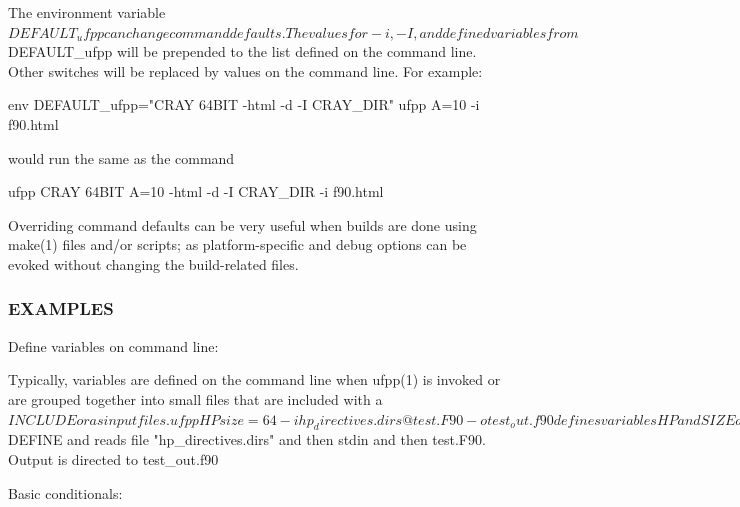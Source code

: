 \begin{DoxyVerb}The environment variable $DEFAULT_ufpp can change command defaults.
The values for -i, -I, and defined variables from $DEFAULT_ufpp will be
prepended to the list defined on the command line. Other switches will be
replaced by values on the command line. For example:

   env DEFAULT_ufpp="CRAY 64BIT -html -d -I CRAY_DIR" ufpp A=10 -i f90.html

would run the same as the command

   ufpp CRAY 64BIT A=10 -html -d -I CRAY_DIR -i f90.html

Overriding command defaults can be very useful when builds are done using
make(1) files and/or scripts; as platform-specific and debug options can
be evoked without changing the build-related files.
\end{DoxyVerb}


\subsubsection*{E\+X\+A\+M\+P\+L\+ES}

\begin{DoxyVerb}Define variables on command line:

Typically, variables are defined on the command line when ufpp(1) is invoked
or are grouped together into small files that are included with a $INCLUDE
or as input files.

  ufpp HP size=64 -i hp_directives.dirs @ test.F90 -o test_out.f90

defines variables HP and SIZE as if the expressions had been on a $DEFINE
and reads file "hp_directives.dirs" and then stdin and then test.F90.
Output is directed to test_out.f90
\end{DoxyVerb}


Basic conditionals\+:

